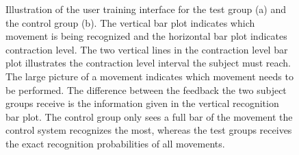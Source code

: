 \begin{figure}[H] 
\centering
	\caption{Illustration of the user training interface for the test group (a) and the control group (b). The vertical bar plot indicates which movement is being recognized and the horizontal bar plot indicates contraction level. The two vertical lines in the contraction level bar plot illustrates the contraction level interval the subject must reach. The large picture of a movement indicates which movement needs to be performed. The difference between the feedback the two subject groups receive is the information given in the vertical recognition bar plot. The control group only sees a full bar of the movement the control system recognizes the most, whereas the test groups receives the exact recognition probabilities of all movements.}
    \label{fig:feedbackGUI}
\end{figure}

